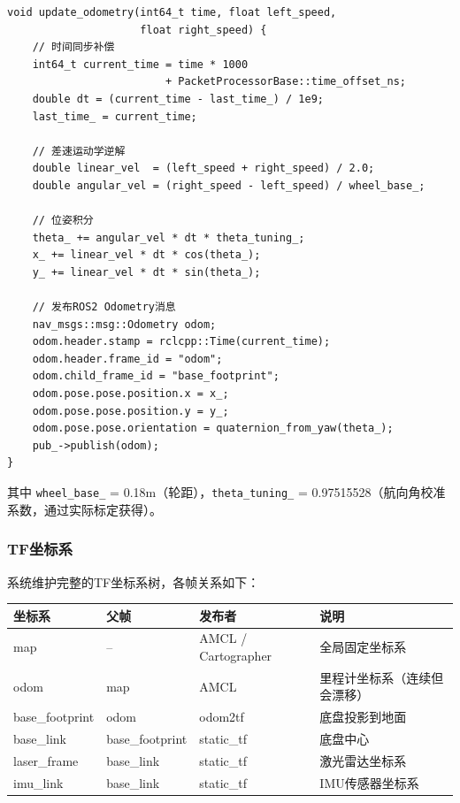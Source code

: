 \documentclass[12pt,a4paper]{ctexart}
\begin{document}
\begin{lstlisting}[style=cstyle, caption={ROS2 UDP桥接节点里程计发布（C++）}]
void update_odometry(int64_t time, float left_speed,
                     float right_speed) {
    // 时间同步补偿
    int64_t current_time = time * 1000
                         + PacketProcessorBase::time_offset_ns;
    double dt = (current_time - last_time_) / 1e9;
    last_time_ = current_time;

    // 差速运动学逆解
    double linear_vel  = (left_speed + right_speed) / 2.0;
    double angular_vel = (right_speed - left_speed) / wheel_base_;

    // 位姿积分
    theta_ += angular_vel * dt * theta_tuning_;
    x_ += linear_vel * dt * cos(theta_);
    y_ += linear_vel * dt * sin(theta_);

    // 发布ROS2 Odometry消息
    nav_msgs::msg::Odometry odom;
    odom.header.stamp = rclcpp::Time(current_time);
    odom.header.frame_id = "odom";
    odom.child_frame_id = "base_footprint";
    odom.pose.pose.position.x = x_;
    odom.pose.pose.position.y = y_;
    odom.pose.pose.orientation = quaternion_from_yaw(theta_);
    pub_->publish(odom);
}
\end{lstlisting}

其中 \texttt{wheel\_base\_} = 0.18m（轮距），\texttt{theta\_tuning\_} = 0.97515528（航向角校准系数，通过实际标定获得）。

\subsubsection{TF坐标系}

系统维护完整的TF坐标系树，各帧关系如下：

\begin{center}
\begin{tabular}{llll}
\toprule
\textbf{坐标系} & \textbf{父帧} & \textbf{发布者} & \textbf{说明} \\
\midrule
map           & --            & AMCL / Cartographer & 全局固定坐标系 \\
odom          & map           & AMCL              & 里程计坐标系（连续但会漂移） \\
base\_footprint & odom        & odom2tf           & 底盘投影到地面 \\
base\_link    & base\_footprint & static\_tf       & 底盘中心 \\
laser\_frame  & base\_link    & static\_tf        & 激光雷达坐标系 \\
imu\_link     & base\_link    & static\_tf        & IMU传感器坐标系 \\
\bottomrule
\end{tabular}
\end{center}
\end{document}
